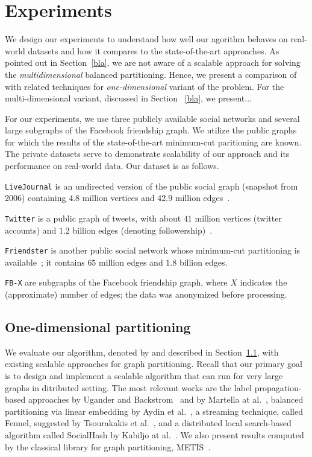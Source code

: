 \section{Experiments}\label{sec:experiments}
We design our experiments to understand how well our agorithm behaves on real-world datasets and how
it compares to the state-of-the-art approaches. As pointed out in Section~\ref{bla}, we are not
aware of a scalable approach for solving the {\it multidimensional} balanced partitioning. Hence, 
we present a comparison of \algnameshort with related techniques for {\it one-dimensional} variant
of the problem. For the multi-dimensional variant, discussed in Section ~\ref{bla}, we present...

For our experiments, we use three publicly available social networks 
and several large subgraphs of the Facebook friendship graph. We utilize the public graphs for which the results of the state-of-the-art minimum-cut paritioning are known. The private datasets serve to demonstrate scalability of our approach and its performance on real-world data. Our dataset is as follows.

\begin{compactitem}
    \item \texttt{LiveJournal} is an undirected version of the public social graph (snapshot from 2006) containing $4.8$ million vertices and $42.9$ million edges~\cite{UB13}.

    \item \texttt{Twitter} is a public graph of tweets, with about $41$ million vertices (twitter accounts) and $1.2$ billion edges (denoting followership)~\cite{KCHM10}.

    \item \texttt{Friendster} is another public social network whose minimum-cut partitioning is available~\cite{LinearEmbed}; it contains $65$ million edges and $1.8$ billion edges.

  \item \texttt{FB-X} are subgraphs of the Facebook friendship graph, where $X$ indicates the (approximate) number of edges; the data was anonymized before processing.
\end{compactitem}

\subsection{One-dimensional partitioning}
We evaluate our algorithm, denoted by \algnameshort and described in Section~\ref{}, with existing scalable approaches for graph partitioning. Recall that our primary goal is to design and implement a scalable 
algorithm that can run for very large graphs in ditributed setting.
The most relevant works are the label propagation-based approaches by Ugander and Backstrom~\cite{UB13} and by Martella at al.~\cite{}, balanced partitioning via linear embedding by Aydin et al.~\cite{}, a streaming technique, called Fennel, suggested by Tsourakakis et al.~\cite{}, and a distributed local search-based algorithm called SocialHash by Kabiljo at al.~\cite{}. We also present results computed by the classical library for graph partitioning, METIS~\cite{bla}.


